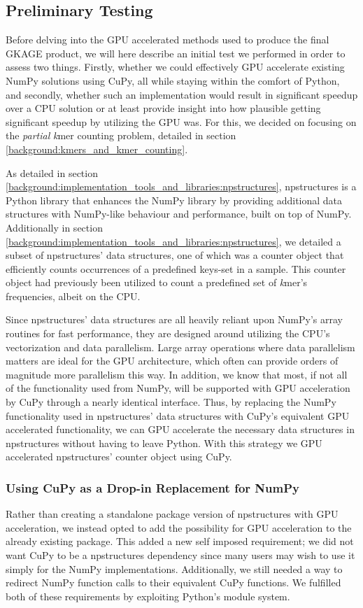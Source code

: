 \subsection{Preliminary Testing} \label{methods:preliminary_testing}
Before delving into the GPU accelerated methods used to produce the final GKAGE product, we will here describe an initial test we performed in order to assess two things. Firstly, whether we could effectively GPU accelerate existing NumPy solutions using CuPy, all while staying within the comfort of Python, and secondly, whether such an implementation would result in significant speedup over a CPU solution or at least provide insight into how plausible getting significant speedup by utilizing the GPU was.
For this, we decided on focusing on the \textit{partial} \textit{k}mer counting problem, detailed in section \ref{background:kmers_and_kmer_counting}.

As detailed in section \ref{background:implementation_tools_and_libraries:npstructures}, npstructures is a Python library that enhances the NumPy library by providing additional data structures with NumPy-like behaviour and performance, built on top of NumPy.
Additionally in section \ref{background:implementation_tools_and_libraries:npstructures}, we detailed a subset of npstructures' data structures, one of which was a counter object that efficiently counts occurrences of a predefined keys-set in a sample.
This counter object had previously been utilized to count a predefined set of \textit{k}mer's frequencies, albeit on the CPU.

Since npstructures' data structures are all heavily reliant upon NumPy's array routines for fast performance, they are designed around utilizing the CPU's vectorization and data parallelism.
Large array operations where data parallelism matters are ideal for the GPU architecture, which often can provide orders of magnitude more parallelism this way.
In addition, we know that most, if not all of the functionality used from NumPy, will be supported with GPU acceleration by CuPy through a nearly identical interface.
Thus, by replacing the NumPy functionality used in npstructures' data structures with CuPy's equivalent GPU accelerated functionality, we can GPU accelerate the necessary data structures in npstructures without having to leave Python.
With this strategy we GPU accelerated npstructures' counter object using CuPy.

\subsubsection{Using CuPy as a Drop-in Replacement for NumPy} \label{methods:preliminary_testing:using_cupy_as_a_drop_in_replacement_for_numpy}
Rather than creating a standalone package version of npstructures with GPU acceleration, we instead opted to add the possibility for GPU acceleration to the already existing package.
This added a new self imposed requirement; we did not want CuPy to be a npstructures dependency since many users may wish to use it simply for the NumPy implementations.
Additionally, we still needed a way to redirect NumPy function calls to their equivalent CuPy functions.
We fulfilled both of these requirements by exploiting Python's module system.

